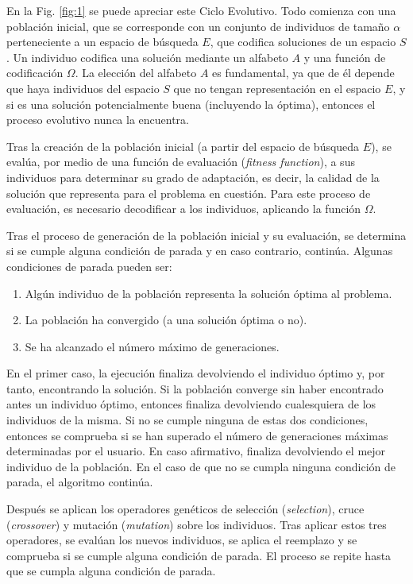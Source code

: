 \documentclass[spanish,a4paper,12pt,twoside]{report}
\begin{document}
  En la Fig. \ref{fig:1} se puede apreciar este Ciclo Evolutivo. Todo comienza con una población inicial, que se corresponde con un conjunto de individuos de tamaño $\alpha$ perteneciente a un espacio de búsqueda $E$, que codifica soluciones de un espacio $S$. Un individuo codifica una solución mediante un alfabeto $A$ y una función de codificación $\Omega$. La elección del alfabeto $A$ es fundamental, ya que de él depende que haya individuos del espacio $S$ que no tengan representación en el espacio $E$, y si es una solución potencialmente buena (incluyendo la óptima), entonces el proceso evolutivo nunca la encuentra. \par
  Tras la creación de la población inicial (a partir del espacio de búsqueda $E$), se evalúa, por medio de una función de evaluación (\emph{fitness function}), a sus individuos para determinar su grado de adaptación, es decir, la calidad de la solución que representa para el problema en cuestión. Para este proceso de evaluación, es necesario decodificar a los individuos, aplicando la función $\Omega$. \par
  Tras el proceso de generación de la población inicial y su evaluación, se determina si se cumple alguna condición de parada y en caso contrario, continúa. Algunas condiciones de parada pueden ser:
  \begin{enumerate}
    \item Algún individuo de la población representa la solución óptima al problema.
    \item La población ha convergido (a una solución óptima o no).
    \item Se ha alcanzado el número máximo de generaciones.
  \end{enumerate} \par
  En el primer caso, la ejecución finaliza devolviendo el individuo óptimo y, por tanto, encontrando la solución. Si la población converge sin haber encontrado antes un individuo óptimo, entonces finaliza devolviendo cualesquiera de los individuos de la misma. Si no se cumple ninguna de estas dos condiciones, entonces se comprueba si se han superado el número de generaciones máximas determinadas por el usuario. En caso afirmativo, finaliza devolviendo el mejor individuo de la población. En el caso de que no se cumpla ninguna condición de parada, el algoritmo continúa. \par
  Después se aplican los operadores genéticos de selección (\emph{selection}), cruce (\emph{crossover}) y mutación (\emph{mutation}) sobre los individuos. Tras aplicar estos tres operadores, se evalúan los nuevos individuos, se aplica el reemplazo y se comprueba si se cumple alguna condición de parada. El proceso se repite hasta que se cumpla alguna condición de parada. \par
\end{document}
